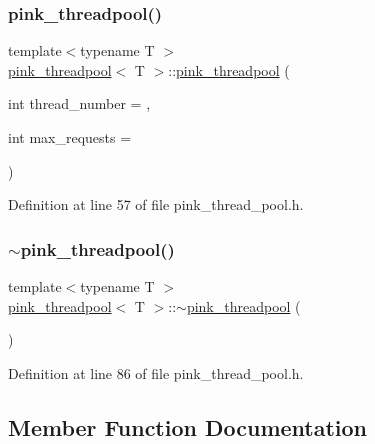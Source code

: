 \subsubsection{\texorpdfstring{pink\+\_\+threadpool()}{pink\_threadpool()}}
{\footnotesize\ttfamily template$<$typename T $>$ \\
\hyperlink{classpink__threadpool}{pink\+\_\+threadpool}$<$ T $>$\+::\hyperlink{classpink__threadpool}{pink\+\_\+threadpool} (\begin{DoxyParamCaption}\item[{int}]{thread\+\_\+number = {},  }\item[{int}]{max\+\_\+requests = {} }\end{DoxyParamCaption})}



Definition at line 57 of file pink\+\_\+thread\+\_\+pool.\+h.

\mbox{\label{classpink__threadpool_a6656ad18ca5a114c6dbd0e5c605bc65c}} 
\subsubsection{\texorpdfstring{$\sim$pink\+\_\+threadpool()}{~pink\_threadpool()}}
{\footnotesize\ttfamily template$<$typename T $>$ \\
\hyperlink{classpink__threadpool}{pink\+\_\+threadpool}$<$ T $>$\+::$\sim$\hyperlink{classpink__threadpool}{pink\+\_\+threadpool} (\begin{DoxyParamCaption}{ }\end{DoxyParamCaption})}



Definition at line 86 of file pink\+\_\+thread\+\_\+pool.\+h.



\subsection{Member Function Documentation}
\mbox{\label{classpink__threadpool_ae4bead5c98203b97c3caeae43296d295}} 

